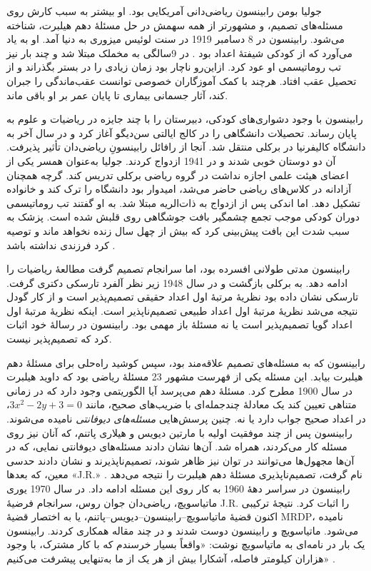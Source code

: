 \documentclass[../../../include/open-logic-section]{subfiles}
\begin{document}



جولیا بومن رابینسون ریاضی‌دانی آمریکایی بود. او بیشتر به سبب کارش روی
مسئله‌های تصمیم، و مشهورتر از همه سهمش در حل مسئلهٔ دهم هیلبرت،
شناخته می‌شود. رابینسون در 8 دسامبر 1919 در سنت لوئیس میزوری به دنیا
آمد. او به یاد می‌آورد که از کودکی شیفتهٔ اعداد بود
\citep[4]{Reid1986}. در 9سالگی به مخملک مبتلا شد و چند بار نیز تب
روماتیسمی او عود کرد. ازاین‌رو ناچار بود زمان زیادی را در بستر بگذراند
و از تحصیل عقب افتاد. هرچند با کمک آموزگاران خصوصی توانست عقب‌ماندگی
را جبران کند، آثار جسمانی بیماری تا پایان عمر بر او باقی ماند.

رابینسون با وجود دشواری‌های کودکی، دبیرستان را با چند جایزه در ریاضیات
و علوم به پایان رساند. تحصیلات دانشگاهی را در کالج ایالتی سن‌دیگو آغاز
کرد و در سال آخر به دانشگاه کالیفرنیا در برکلی منتقل شد. آنجا از
رافائل رابینسونِ ریاضی‌دان تأثیر پذیرفت. آن دو دوستان خوبی شدند و در
1941 ازدواج کردند. جولیا به‌عنوان همسر یکی از اعضای هیئت علمی اجازه
نداشت در گروه ریاضی برکلی تدریس کند. گرچه همچنان آزادانه در کلاس‌های
ریاضی حاضر می‌شد، امیدوار بود دانشگاه را ترک کند و خانواده تشکیل دهد.
اما اندکی پس از ازدواج به ذات‌الریه مبتلا شد. به او گفتند تب روماتیسمی
دوران کودکی موجب تجمع چشمگیر بافت جوشگاهی روی قلبش شده است. پزشک به
سبب شدت این بافت پیش‌بینی کرد که بیش از چهل سال زنده نخواهد ماند و
توصیه کرد فرزندی نداشته باشد \citep[13]{Reid1986}.

رابینسون مدتی طولانی افسرده بود، اما سرانجام تصمیم گرفت مطالعهٔ ریاضیات
را ادامه دهد. به برکلی بازگشت و در سال 1948 زیر نظر آلفرد تارسکی دکتری
گرفت. تارسکی نشان داده بود نظریهٔ مرتبهٔ اول اعداد حقیقی تصمیم‌پذیر
است و از کار گودل نتیجه می‌شد نظریهٔ مرتبهٔ اول اعداد طبیعی تصمیم‌ناپذیر
است. اینکه نظریهٔ مرتبهٔ اول اعداد گویا تصمیم‌پذیر است یا نه مسئلهٔ
باز مهمی بود. رابینسون در رسالهٔ خود \citeyearpar{Robinson1949} اثبات
کرد که تصمیم‌پذیر نیست.

رابینسون که به مسئله‌های تصمیم علاقه‌مند بود، سپس کوشید راه‌حلی برای
مسئلهٔ دهم هیلبرت بیابد. این مسئله یکی از فهرست مشهور 23 مسئلهٔ ریاضی
بود که داوید هیلبرت در سال 1900 مطرح کرد. مسئلهٔ دهم می‌پرسد آیا
الگوریتمی وجود دارد که در زمانی متناهی تعیین کند یک معادلهٔ چندجمله‌ای
با ضریب‌های صحیح، مانند $3x^2 - 2y +3 = 0$، در اعداد صحیح جواب دارد یا
نه. چنین پرسش‌هایی \emph{مسئله‌های دیوفانتی} نامیده می‌شوند. رابینسون
پس از چند موفقیت اولیه با مارتین دیویس و هیلاری پاتنم، که آنان نیز روی
مسئله کار می‌کردند، همراه شد. آن‌ها نشان دادند مسئله‌های دیوفانتی
نمایی، که در آن‌ها مجهول‌ها می‌توانند در توان نیز ظاهر شوند،
تصمیم‌ناپذیرند و نشان دادند حدسی معین، که بعدها «J.R.» نام گرفت،
تصمیم‌ناپذیری مسئلهٔ دهم هیلبرت را نتیجه می‌دهد
\citep{DavisPutnamRobinson1961}. رابینسون در سراسر دههٔ 1960 به کار روی
این مسئله ادامه داد. در سال 1970 یوری ماتیاسویچ، ریاضی‌دان جوان روس،
سرانجام فرضیهٔ J.R. را اثبات کرد. نتیجهٔ ترکیبی اکنون قضیهٔ
ماتیاسویچ--رابینسون--دیویس--پاتنم، یا به اختصار قضیهٔ MRDP، نامیده
می‌شود. ماتیاسویچ و رابینسون دوست شدند و در چند مقاله همکاری کردند.
رابینسون یک بار در نامه‌ای به ماتیاسویچ نوشت: «واقعاً بسیار خرسندم که
با کار مشترک، با وجود هزاران کیلومتر فاصله، آشکارا بیش از هر یک از ما
به‌تنهایی پیشرفت می‌کنیم» \citep[45]{Matijasevich1992}.
\end{document}
